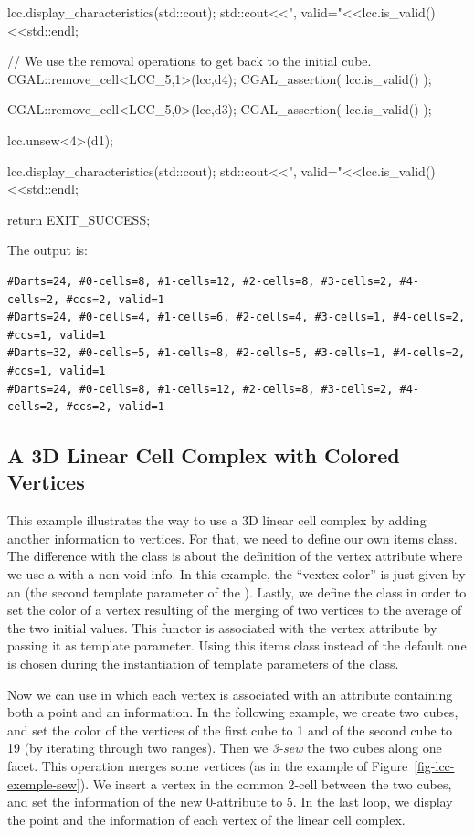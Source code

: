 \begin{ccExampleCode}
{  lcc.display_characteristics(std::cout);
  std::cout<<", valid="<<lcc.is_valid()<<std::endl;
  
  // We use the removal operations to get back to the initial cube.
  CGAL::remove_cell<LCC_5,1>(lcc,d4);
  CGAL_assertion( lcc.is_valid() );

  CGAL::remove_cell<LCC_5,0>(lcc,d3);
  CGAL_assertion( lcc.is_valid() );

  lcc.unsew<4>(d1);

  lcc.display_characteristics(std::cout);
  std::cout<<", valid="<<lcc.is_valid()<<std::endl;

	return EXIT_SUCCESS;
}
\end{ccExampleCode}

The output is:
\begin{verbatim}
#Darts=24, #0-cells=8, #1-cells=12, #2-cells=8, #3-cells=2, #4-cells=2, #ccs=2, valid=1
#Darts=24, #0-cells=4, #1-cells=6, #2-cells=4, #3-cells=1, #4-cells=2, #ccs=1, valid=1
#Darts=32, #0-cells=5, #1-cells=8, #2-cells=5, #3-cells=1, #4-cells=2, #ccs=1, valid=1
#Darts=24, #0-cells=8, #1-cells=12, #2-cells=8, #3-cells=2, #4-cells=2, #ccs=2, valid=1
\end{verbatim}

\subsection{A 3D Linear Cell Complex with Colored Vertices}
\label{ssec-exemple-color-vertices}

This example illustrates the way to use a 3D linear cell complex by
adding another information to vertices. For that, we need to define
our own items class.  The difference with the
 class is about the definition of
the vertex attribute where we use a 
with a non void info. In this example, the ``vextex color'' is just
given by an  (the second template parameter of the
).  Lastly, we define the
 class in order to set the color of a vertex
resulting of the merging of two vertices to the average of the two
initial values. This functor is associated with the vertex attribute
by passing it as template parameter.  Using this items class instead of
the default one is chosen during the instantiation of template
parameters of the  class.

Now we can use  in which each vertex is associated with an
attribute containing both a point and an information. In the following
example, we create two cubes, and set the color of the vertices of the
first cube to 1 and of the second cube to 19 (by iterating through two
 ranges). Then we \emph{3-sew} the two
cubes along one facet. This operation merges some vertices (as in the
example of Figure~\ref{fig-lcc-exemple-sew}).  We insert a vertex in
the common 2-cell between the two cubes, and set the information of
the new 0-attribute to 5.  In the last loop, we display the point and
the information of each vertex of the linear cell complex.

